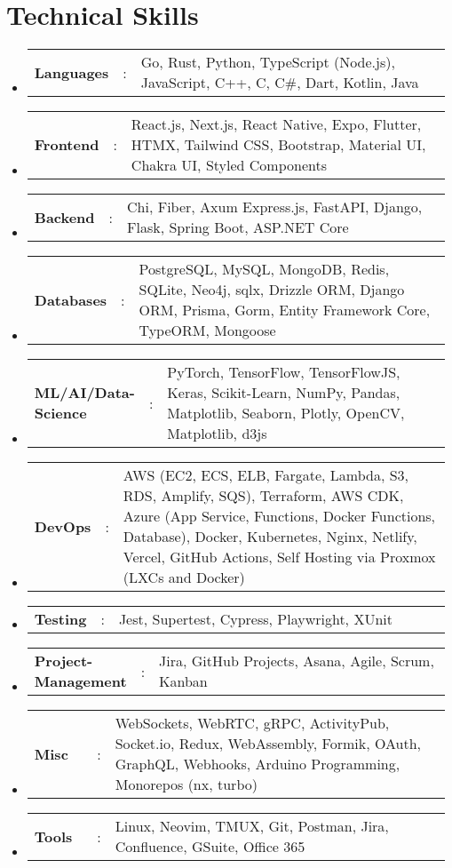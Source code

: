 \documentclass[a4paper,11pt]{article}
\newcommand{\resumeSectionType}[3]{
  \item\begin{tabular*}{0.96\textwidth}[t]{
    p{0.15\linewidth}p{0.02\linewidth}p{0.81\linewidth}
  }
    \textbf{#1} & #2 & #3
  \end{tabular*}\vspace{-2pt}
}
\newcommand{\resumeHeadingListStart}{
  \begin{itemize}[leftmargin=0.15in, label={}]
}
\newcommand{\resumeHeadingListEnd}{\end{itemize}}
\begin{document}
\section{\LARGE{Technical Skills}}
  \resumeHeadingListStart{}
    \resumeSectionType{Languages}{:}{Go, Rust, Python, TypeScript (Node.js), JavaScript, C++, C, C\#, Dart, Kotlin, Java}
    \resumeSectionType{Frontend}{:}{React.js, Next.js, React Native, Expo, Flutter, HTMX, Tailwind CSS, Bootstrap, Material UI, Chakra UI, Styled Components}
    \resumeSectionType{Backend}{:}{Chi, Fiber, Axum Express.js, FastAPI, Django, Flask, Spring Boot, ASP.NET Core}
    \resumeSectionType{Databases}{:}{PostgreSQL, MySQL, MongoDB, Redis, SQLite, Neo4j, sqlx, Drizzle ORM, Django ORM, Prisma, Gorm, Entity Framework Core, TypeORM, Mongoose}
	\resumeSectionType{ML/AI/Data-Science}{:}{PyTorch, TensorFlow, TensorFlowJS, Keras, Scikit-Learn, NumPy, Pandas, Matplotlib, Seaborn, Plotly, OpenCV, Matplotlib, d3js}
    \resumeSectionType{DevOps}{:}{AWS (EC2, ECS, ELB, Fargate, Lambda, S3, RDS, Amplify, SQS), Terraform, AWS CDK, Azure (App Service, Functions, Docker Functions, Database), Docker, Kubernetes, Nginx, Netlify, Vercel, GitHub Actions, Self Hosting via Proxmox (LXCs and Docker)}
	\resumeSectionType{Testing}{:}{Jest, Supertest, Cypress, Playwright, XUnit}
	\resumeSectionType{Project-Management}{:}{Jira, GitHub Projects, Asana, Agile, Scrum, Kanban}
	\resumeSectionType{Misc}{:}{WebSockets, WebRTC, gRPC, ActivityPub, Socket.io, Redux, WebAssembly, Formik, OAuth, GraphQL, Webhooks, Arduino Programming, Monorepos (nx, turbo)}
	\resumeSectionType{Tools}{:}{Linux, Neovim, TMUX, Git, Postman, Jira, Confluence, GSuite, Office 365}
  \resumeHeadingListEnd{}


\end{document}
